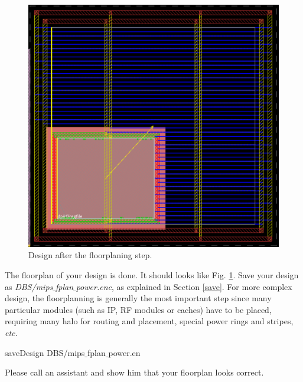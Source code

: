 	\parbox[t]{\dimexpr\textwidth-\leftmargin}{%
	\begin{figure}
		\vspace{0mm}
		\centering
		\vspace{-\baselineskip}
	\includegraphics[scale=0.3]{figures/lab5_backend/mips_floorplan}
\caption{Design after the floorplaning step.}
\label{mips_floorplan}
	\end{figure}
The floorplan of your design is done. It should looks like Fig. \ref{mips_floorplan}. Save your design as \textit{DBS/mips$\_$fplan$\_$power.enc}, as explained in Section \ref{save}. For more complex design, the floorplanning is generally the most important step since many particular modules (such as IP, RF modules or caches) have to be placed, requiring many halo for routing and placement, special power rings and stripes, \textit{etc.}
				\begin{codeline}
	saveDesign DBS/mips$\_$fplan$\_$power.en
\end{codeline}

\begin{checkpoint}\label{check1}
	Please call an assistant and show him that your floorplan looks correct.
\end{checkpoint}
}
\clearpage

